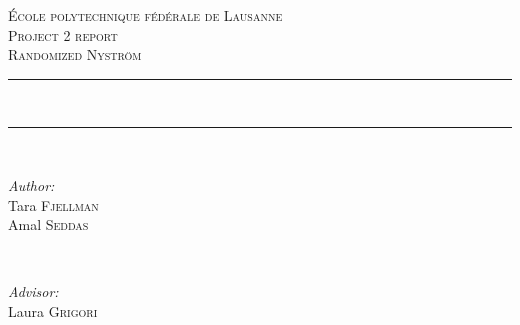 \begin{titlepage}
\newcommand{\HRule}{\rule{\linewidth}{0.5mm}} %

\center  %
 

\vspace{3cm}
\textsc{\LARGE École polytechnique fédérale de Lausanne}\\[1.5cm] %

\textsc{\Large Project 2 report}\\[0.5cm] %
\textsc{\large Randomized Nystr\"om
}\\[0.5cm] %


\HRule \\[0.4cm] %



\HRule \\[1.5cm]
 

\begin{minipage}{0.4\textwidth}
\begin{flushleft} \large

\emph{Author:}\\
Tara \textsc{Fjellman}\\
Amal \textsc{Seddas}\\




\end{flushleft}
\end{minipage}
~
\begin{minipage}{0.4\textwidth}
\begin{flushright} \large

\emph{Advisor:} \\
Laura \textsc{Grigori
 }\\
\end{flushright}
\end{minipage}\\[10cm]
%



\end{titlepage}
